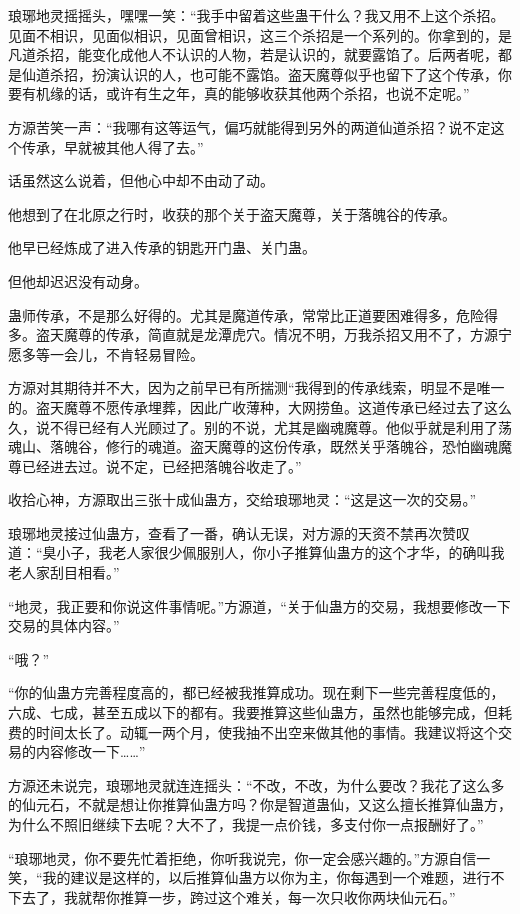 \begin{this_body}
琅琊地灵摇摇头，嘿嘿一笑：“我手中留着这些蛊干什么？我又用不上这个杀招。见面不相识，见面似相识，见面曾相识，这三个杀招是一个系列的。你拿到的，是凡道杀招，能变化成他人不认识的人物，若是认识的，就要露馅了。后两者呢，都是仙道杀招，扮演认识的人，也可能不露馅。盗天魔尊似乎也留下了这个传承，你要有机缘的话，或许有生之年，真的能够收获其他两个杀招，也说不定呢。”

方源苦笑一声：“我哪有这等运气，偏巧就能得到另外的两道仙道杀招？说不定这个传承，早就被其他人得了去。”

话虽然这么说着，但他心中却不由动了动。

他想到了在北原之行时，收获的那个关于盗天魔尊，关于落魄谷的传承。

他早已经炼成了进入传承的钥匙开门蛊、关门蛊。

但他却迟迟没有动身。

蛊师传承，不是那么好得的。尤其是魔道传承，常常比正道要困难得多，危险得多。盗天魔尊的传承，简直就是龙潭虎穴。情况不明，万我杀招又用不了，方源宁愿多等一会儿，不肯轻易冒险。

方源对其期待并不大，因为之前早已有所揣测“我得到的传承线索，明显不是唯一的。盗天魔尊不愿传承埋葬，因此广收薄种，大网捞鱼。这道传承已经过去了这么久，说不得已经有人光顾过了。别的不说，尤其是幽魂魔尊。他似乎就是利用了荡魂山、落魄谷，修行的魂道。盗天魔尊的这份传承，既然关乎落魄谷，恐怕幽魂魔尊已经进去过。说不定，已经把落魄谷收走了。”

收拾心神，方源取出三张十成仙蛊方，交给琅琊地灵：“这是这一次的交易。”

琅琊地灵接过仙蛊方，查看了一番，确认无误，对方源的天资不禁再次赞叹道：“臭小子，我老人家很少佩服别人，你小子推算仙蛊方的这个才华，的确叫我老人家刮目相看。”

“地灵，我正要和你说这件事情呢。”方源道，“关于仙蛊方的交易，我想要修改一下交易的具体内容。”

“哦？”

“你的仙蛊方完善程度高的，都已经被我推算成功。现在剩下一些完善程度低的，六成、七成，甚至五成以下的都有。我要推算这些仙蛊方，虽然也能够完成，但耗费的时间太长了。动辄一两个月，使我抽不出空来做其他的事情。我建议将这个交易的内容修改一下……”

方源还未说完，琅琊地灵就连连摇头：“不改，不改，为什么要改？我花了这么多的仙元石，不就是想让你推算仙蛊方吗？你是智道蛊仙，又这么擅长推算仙蛊方，为什么不照旧继续下去呢？大不了，我提一点价钱，多支付你一点报酬好了。”

“琅琊地灵，你不要先忙着拒绝，你听我说完，你一定会感兴趣的。”方源自信一笑，“我的建议是这样的，以后推算仙蛊方以你为主，你每遇到一个难题，进行不下去了，我就帮你推算一步，跨过这个难关，每一次只收你两块仙元石。”


\end{this_body}
